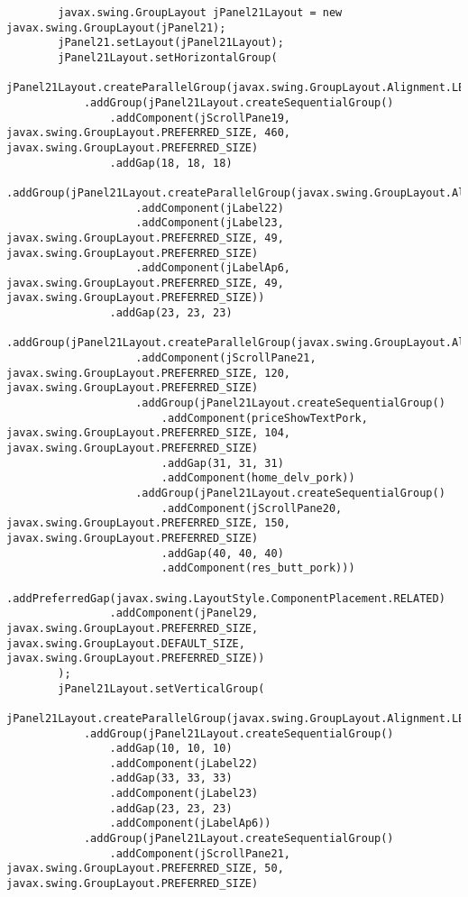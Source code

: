\documentclass[12pt,a4paper]{article}
\begin{document}
\begin{lstlisting}
        javax.swing.GroupLayout jPanel21Layout = new javax.swing.GroupLayout(jPanel21);
        jPanel21.setLayout(jPanel21Layout);
        jPanel21Layout.setHorizontalGroup(
            jPanel21Layout.createParallelGroup(javax.swing.GroupLayout.Alignment.LEADING)
            .addGroup(jPanel21Layout.createSequentialGroup()
                .addComponent(jScrollPane19, javax.swing.GroupLayout.PREFERRED_SIZE, 460, javax.swing.GroupLayout.PREFERRED_SIZE)
                .addGap(18, 18, 18)
                .addGroup(jPanel21Layout.createParallelGroup(javax.swing.GroupLayout.Alignment.LEADING)
                    .addComponent(jLabel22)
                    .addComponent(jLabel23, javax.swing.GroupLayout.PREFERRED_SIZE, 49, javax.swing.GroupLayout.PREFERRED_SIZE)
                    .addComponent(jLabelAp6, javax.swing.GroupLayout.PREFERRED_SIZE, 49, javax.swing.GroupLayout.PREFERRED_SIZE))
                .addGap(23, 23, 23)
                .addGroup(jPanel21Layout.createParallelGroup(javax.swing.GroupLayout.Alignment.LEADING)
                    .addComponent(jScrollPane21, javax.swing.GroupLayout.PREFERRED_SIZE, 120, javax.swing.GroupLayout.PREFERRED_SIZE)
                    .addGroup(jPanel21Layout.createSequentialGroup()
                        .addComponent(priceShowTextPork, javax.swing.GroupLayout.PREFERRED_SIZE, 104, javax.swing.GroupLayout.PREFERRED_SIZE)
                        .addGap(31, 31, 31)
                        .addComponent(home_delv_pork))
                    .addGroup(jPanel21Layout.createSequentialGroup()
                        .addComponent(jScrollPane20, javax.swing.GroupLayout.PREFERRED_SIZE, 150, javax.swing.GroupLayout.PREFERRED_SIZE)
                        .addGap(40, 40, 40)
                        .addComponent(res_butt_pork)))
                .addPreferredGap(javax.swing.LayoutStyle.ComponentPlacement.RELATED)
                .addComponent(jPanel29, javax.swing.GroupLayout.PREFERRED_SIZE, javax.swing.GroupLayout.DEFAULT_SIZE, javax.swing.GroupLayout.PREFERRED_SIZE))
        );
        jPanel21Layout.setVerticalGroup(
            jPanel21Layout.createParallelGroup(javax.swing.GroupLayout.Alignment.LEADING)
            .addGroup(jPanel21Layout.createSequentialGroup()
                .addGap(10, 10, 10)
                .addComponent(jLabel22)
                .addGap(33, 33, 33)
                .addComponent(jLabel23)
                .addGap(23, 23, 23)
                .addComponent(jLabelAp6))
            .addGroup(jPanel21Layout.createSequentialGroup()
                .addComponent(jScrollPane21, javax.swing.GroupLayout.PREFERRED_SIZE, 50, javax.swing.GroupLayout.PREFERRED_SIZE)

\end{lstlisting}
\end{document}
